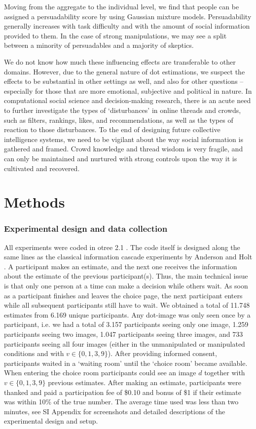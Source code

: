 \documentclass[9pt,a4paper,twocolumn,lineno]{article}
\begin{document}
Moving from the aggregate to the individual level, we find that people can be assigned a persuadability score by using Gaussian mixture models. Persuadability generally increases with task difficulty and with the amount of social information provided to them. In the case of strong manipulations, we may see a split between a minority of persuadables and a majority of skeptics.

We do not know how much these influencing effects are transferable to other domains. However, due to the general nature of dot estimations, we suspect the effects to be substantial in other settings as well, and also for other questions – especially for those that are more emotional, subjective and political in nature. In computational social science and decision-making research,  there is an acute need to further investigate the types of ‘disturbances’ in online threads and crowds, such as filters, rankings, likes, and recommendations, as well as the types of reaction to those disturbances. To the end of designing future collective intelligence systems, we need to be vigilant about the way social information is gathered and framed. Crowd knowledge and thread wisdom is very fragile, and can only be maintained and nurtured with strong controls upon the way it is cultivated and recovered.

\section*{Methods}\small
\subsubsection*{Experimental design and data collection} 
All experiments were coded in otree 2.1 \cite{chen2016otree}. The code itself is designed along the same lines as the classical information cascade experiments by Anderson and Holt \cite{anderson1997information}. A participant makes an estimate, and the next one receives the information about the estimate of the previous participant(s). Thus, the main technical issue is that only one person at a time can make a decision while others wait. As soon as a participant finishes and leaves the choice page, the next participant enters while all subsequent participants still have to wait. We obtained a total of 11.748 estimates from 6.169 unique participants. Any dot-image was only seen once by a participant, i.e. we had a total of 3.157 participants seeing only one image, 1.259 participants seeing two images, 1.047 participants seeing three images, and 733 participants seeing all four images (either in the unmanipulated or manipulated conditions and with $v \in \{0, 1, 3, 9\}$). After providing informed consent, participants waited in a ‘waiting room’ until the ‘choice room’ became available. When entering the choice room participants could see an image $d$ together with $v \in \{0,1,3,9\}$ previous estimates. After making an estimate, participants were thanked and paid a participation fee of \$0.10 and bonus of \$1 if their estimate was within 10\% of the true number. The average time used was less than two minutes, see SI Appendix for screenshots and detailed descriptions of the experimental design and setup.
\end{document}
